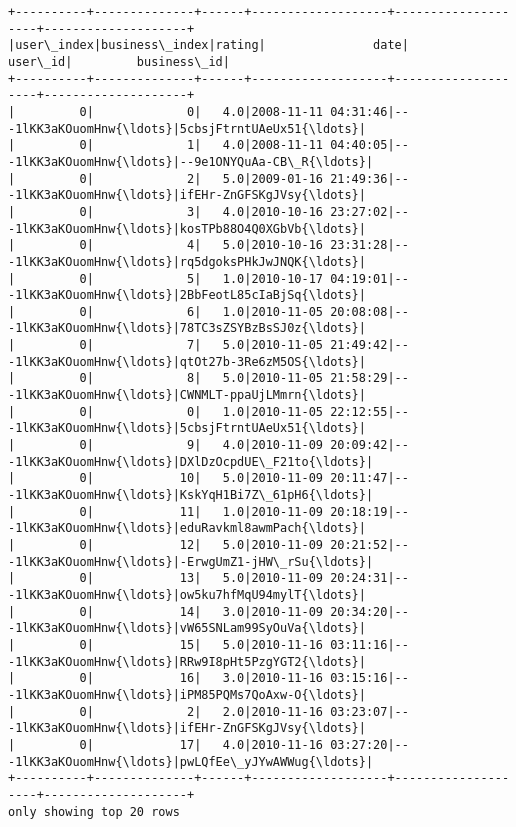 \documentclass[11pt]{article}
\begin{document}
    \begin{Verbatim}[commandchars=\\\{\}]
+----------+--------------+------+-------------------+--------------------+--------------------+
|user\_index|business\_index|rating|               date|             user\_id|         business\_id|
+----------+--------------+------+-------------------+--------------------+--------------------+
|         0|             0|   4.0|2008-11-11 04:31:46|---1lKK3aKOuomHnw{\ldots}|5cbsjFtrntUAeUx51{\ldots}|
|         0|             1|   4.0|2008-11-11 04:40:05|---1lKK3aKOuomHnw{\ldots}|--9e1ONYQuAa-CB\_R{\ldots}|
|         0|             2|   5.0|2009-01-16 21:49:36|---1lKK3aKOuomHnw{\ldots}|ifEHr-ZnGFSKgJVsy{\ldots}|
|         0|             3|   4.0|2010-10-16 23:27:02|---1lKK3aKOuomHnw{\ldots}|kosTPb88O4Q0XGbVb{\ldots}|
|         0|             4|   5.0|2010-10-16 23:31:28|---1lKK3aKOuomHnw{\ldots}|rq5dgoksPHkJwJNQK{\ldots}|
|         0|             5|   1.0|2010-10-17 04:19:01|---1lKK3aKOuomHnw{\ldots}|2BbFeotL85cIaBjSq{\ldots}|
|         0|             6|   1.0|2010-11-05 20:08:08|---1lKK3aKOuomHnw{\ldots}|78TC3sZSYBzBsSJ0z{\ldots}|
|         0|             7|   5.0|2010-11-05 21:49:42|---1lKK3aKOuomHnw{\ldots}|qtOt27b-3Re6zM5OS{\ldots}|
|         0|             8|   5.0|2010-11-05 21:58:29|---1lKK3aKOuomHnw{\ldots}|CWNMLT-ppaUjLMmrn{\ldots}|
|         0|             0|   1.0|2010-11-05 22:12:55|---1lKK3aKOuomHnw{\ldots}|5cbsjFtrntUAeUx51{\ldots}|
|         0|             9|   4.0|2010-11-09 20:09:42|---1lKK3aKOuomHnw{\ldots}|DXlDzOcpdUE\_F21to{\ldots}|
|         0|            10|   5.0|2010-11-09 20:11:47|---1lKK3aKOuomHnw{\ldots}|KskYqH1Bi7Z\_61pH6{\ldots}|
|         0|            11|   1.0|2010-11-09 20:18:19|---1lKK3aKOuomHnw{\ldots}|eduRavkml8awmPach{\ldots}|
|         0|            12|   5.0|2010-11-09 20:21:52|---1lKK3aKOuomHnw{\ldots}|-ErwgUmZ1-jHW\_rSu{\ldots}|
|         0|            13|   5.0|2010-11-09 20:24:31|---1lKK3aKOuomHnw{\ldots}|ow5ku7hfMqU94mylT{\ldots}|
|         0|            14|   3.0|2010-11-09 20:34:20|---1lKK3aKOuomHnw{\ldots}|vW65SNLam99SyOuVa{\ldots}|
|         0|            15|   5.0|2010-11-16 03:11:16|---1lKK3aKOuomHnw{\ldots}|RRw9I8pHt5PzgYGT2{\ldots}|
|         0|            16|   3.0|2010-11-16 03:15:16|---1lKK3aKOuomHnw{\ldots}|iPM85PQMs7QoAxw-O{\ldots}|
|         0|             2|   2.0|2010-11-16 03:23:07|---1lKK3aKOuomHnw{\ldots}|ifEHr-ZnGFSKgJVsy{\ldots}|
|         0|            17|   4.0|2010-11-16 03:27:20|---1lKK3aKOuomHnw{\ldots}|pwLQfEe\_yJYwAWWug{\ldots}|
+----------+--------------+------+-------------------+--------------------+--------------------+
only showing top 20 rows


    \end{Verbatim}
\end{document}

